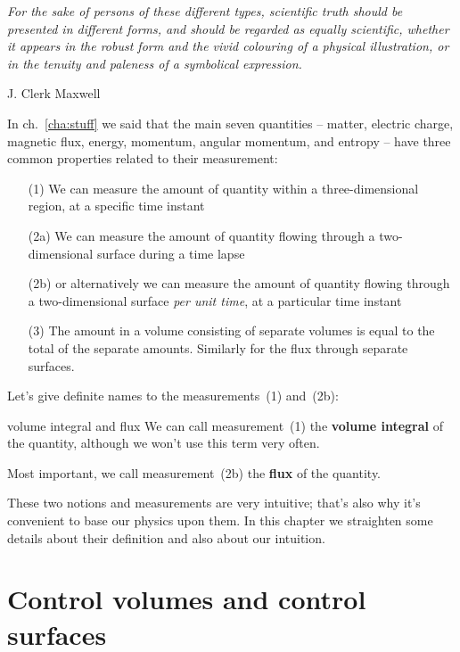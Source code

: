 \documentclass[a4paper,12pt,%
onecolumn,oneside,titlepage,%
british%
]{memoir}
\renewcommand*{\|}[1][]{\nonscript\:#1\vert\nonscript\:\mathopen{}}
\newcommand*{\chap}{ch.}%
\begin{document}
\epigraph{\emph{%
For the sake of persons of these different types, scientific truth should be presented in different forms, and should be regarded as equally scientific, whether it appears in the robust form and the vivid colouring of a physical illustration, or in the tenuity and paleness of a symbolical expression.%
}}{J. Clerk Maxwell \cites*{maxwell1870}}


In \chap~\ref{cha:stuff} we said that the main seven quantities -- matter, electric charge, magnetic flux, energy, momentum, angular momentum, and entropy -- have three common properties related to their measurement:
\begin{enumerate}\color{green}
\item[(1)] We can measure the amount of quantity within a three-dimensional region, at a specific time instant
\item[(2a)] We can measure the amount of quantity flowing through a two-dimensional surface during a time lapse\textellipsis
\item[(2b)] \textellipsis or alternatively we can measure the amount of quantity flowing through a two-dimensional surface \emph{per unit time}, at a particular time instant
\item[(3)]\label{item:extensivity}The amount in a volume consisting of separate volumes is equal to the total of the separate amounts. Similarly for the flux through separate surfaces.
\end{enumerate}

Let's give definite names to the measurements~(1) and~(2b):
\begin{definition}{volume integral and flux}
  We can call measurement~(1) the \textbf{volume integral} of the quantity, although we won't use this term very often.

  \smallskip

  Most important, we call measurement~(2b) the \textbf{flux} of the quantity. %
\end{definition}

\smallskip

These two notions and measurements are very intuitive; that's also why it's convenient to base our physics upon them. In this chapter we straighten some details about their definition and also about our intuition.

\section{Control volumes and control surfaces}
\label{sec:choice_surfaces}
\end{document}
